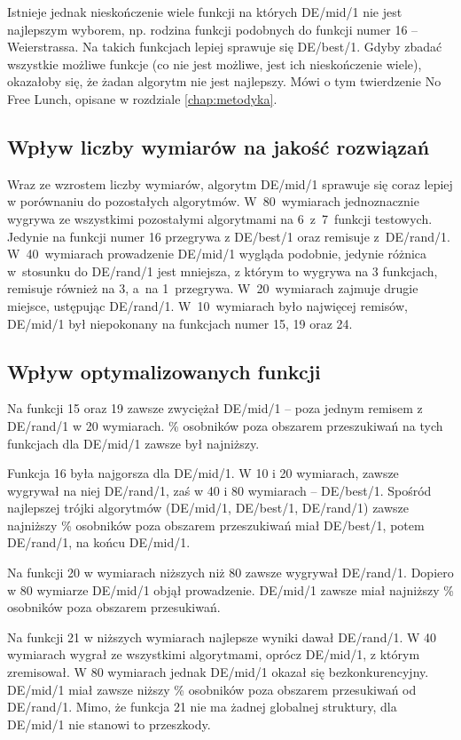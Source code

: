 \documentclass[a4paper,onecolumn,oneside,12pt,wide,floatssmall]{mwrep}
\theoremstyle{definition}
\theoremstyle{plain}%
\theoremstyle{remark}
\begin{document}
Istnieje jednak nieskończenie wiele funkcji na których DE/mid/1 nie jest najlepszym wyborem, np. rodzina
funkcji podobnych do funkcji numer 16 -- Weierstrassa. Na takich funkcjach lepiej sprawuje się 
DE/best/1. Gdyby zbadać wszystkie możliwe funkcje (co nie jest możliwe, jest ich nieskończenie wiele),
okazałoby się, że żadan algorytm nie jest
najlepszy. Mówi o tym twierdzenie No Free Lunch, opisane w rozdziale \ref{chap:metodyka}.

\subsection{Wpływ liczby wymiarów na jakość rozwiązań}

Wraz ze wzrostem liczby wymiarów, algorytm DE/mid/1 sprawuje się coraz lepiej w porównaniu do
pozostałych algorytmów.
W~80~wymiarach jednoznacznie wygrywa ze wszystkimi pozostałymi algorytmami na 6~z~7~funkcji testowych.
Jedynie na funkcji numer 16 przegrywa z DE/best/1 oraz remisuje z~DE/rand/1.
W~40~wymiarach prowadzenie DE/mid/1 wygląda podobnie, jedynie różnica w~stosunku do DE/rand/1
jest mniejsza, z którym to wygrywa na 3 funkcjach, remisuje również na 3, a~na 1~przegrywa.
W~20~wymiarach zajmuje drugie miejsce, ustępując DE/rand/1.
W~10~wymiarach było najwięcej remisów, DE/mid/1 był niepokonany na funkcjach numer 15, 19 oraz 24.

\subsection{Wpływ optymalizowanych funkcji}

Na funkcji 15 oraz 19 zawsze zwyciężał DE/mid/1 -- poza jednym remisem z DE/rand/1 w 20 wymiarach.
\% osobników poza obszarem przeszukiwań na tych funkcjach dla DE/mid/1 zawsze był najniższy.

Funkcja 16 była najgorsza dla DE/mid/1. W 10 i 20 wymiarach, zawsze wygrywał na niej DE/rand/1,
zaś w 40 i 80 wymiarach -- DE/best/1. Spośród najlepszej trójki algorytmów (DE/mid/1, DE/best/1,
DE/rand/1) zawsze najniższy \% osobników poza obszarem przeszukiwań miał DE/best/1, 
potem DE/rand/1, na końcu DE/mid/1. 

Na funkcji 20 w wymiarach niższych niż 80 zawsze wygrywał DE/rand/1. Dopiero w 80 wymiarze DE/mid/1
objął prowadzenie. DE/mid/1 zawsze miał najniższy \% osobników poza obszarem przesukiwań.

Na funkcji 21 w niższych wymiarach najlepsze wyniki dawał DE/rand/1. W 40 wymiarach wygrał ze 
wszystkimi algorytmami, oprócz DE/mid/1, z którym zremisował. W 80 wymiarach jednak DE/mid/1
okazał się bezkonkurencyjny. DE/mid/1 miał zawsze niższy \% osobników poza obszarem przesukiwań
od DE/rand/1. Mimo, że funkcja 21 nie ma żadnej globalnej struktury, dla DE/mid/1 nie stanowi to 
przeszkody.
\end{document}
